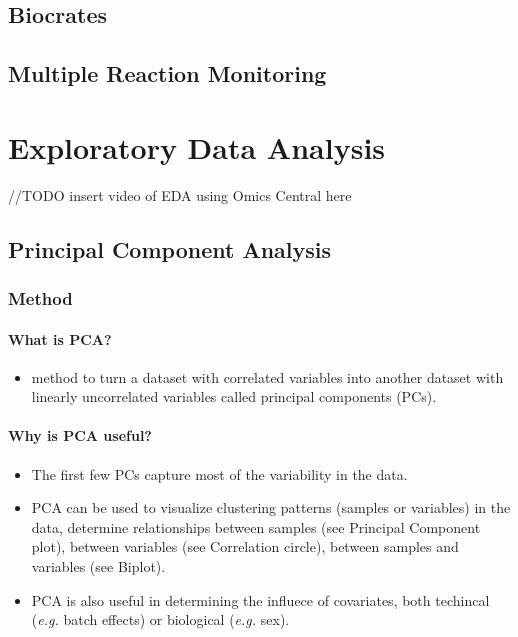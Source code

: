 \documentclass[]{book}
\providecommand{\tightlist}{%
  \setlength{\itemsep}{0pt}\setlength{\parskip}{0pt}}
\begin{document}
\section{Biocrates}\label{biocrates}

\section{Multiple Reaction
Monitoring}\label{multiple-reaction-monitoring}

\chapter{Exploratory Data Analysis}\label{eda}

//TODO insert video of EDA using Omics Central here

\section{Principal Component
Analysis}\label{principal-component-analysis}

\subsection{Method}\label{method}

\subsubsection{What is PCA?}\label{what-is-pca}

\begin{itemize}
\tightlist
\item
  method to turn a dataset with correlated variables into another
  dataset with linearly uncorrelated variables called principal
  components (PCs).
\end{itemize}

\subsubsection{Why is PCA useful?}\label{why-is-pca-useful}

\begin{itemize}
\tightlist
\item
  The first few PCs capture most of the variability in the data.
\item
  PCA can be used to visualize clustering patterns (samples or
  variables) in the data, determine relationships between samples (see
  Principal Component plot), between variables (see Correlation circle),
  between samples and variables (see Biplot).
\item
  PCA is also useful in determining the influece of covariates, both
  techincal (\emph{e.g.} batch effects) or biological (\emph{e.g.} sex).
\end{itemize}
\end{document}
